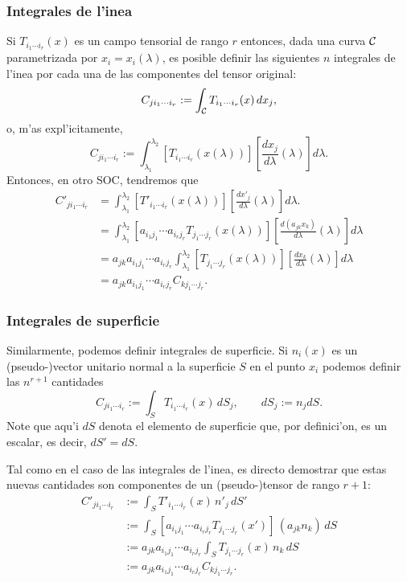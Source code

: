 \subsubsection{Integrales de l'inea}
Si $T_{i_1\cdots i_r}(x)$ es un campo tensorial de rango $r$ entonces, dada una curva $\cal C$ parametrizada por $x_i=x_i(\lambda)$, es posible definir las siguientes $n$ integrales de l'inea por cada una de las componentes del tensor original:
\begin{equation}
C_{ji_1\cdots i_r}:=\int_{\cal C}T_{i_1\cdots i_r}(x)\,dx_j,
\end{equation}
o, m'as expl'icitamente,
\begin{equation}
C_{ji_1\cdots i_r}:=\int_{\lambda_1}^{\lambda_2}\left[T_{i_1\cdots i_r}(x(\lambda))\right]\left[\frac{dx_j}{d\lambda}(\lambda)\right]d\lambda.
\end{equation}
Entonces, en otro SOC, tendremos que
\begin{align}
C'_{ji_1\cdots i_r} &=\int_{\lambda_1}^{\lambda_2}\left[T'_{i_1\cdots i_r}(x(\lambda))\right]\left[\frac{dx'_j}{d\lambda}(\lambda)\right]d\lambda.\\
&=\int_{\lambda_1}^{\lambda_2}\left[a_{i_1j_1}\cdots a_{i_rj_r}T_{j_1\cdots j_r}(x(\lambda))\right]\left[\frac{d(a_{jk}x_k)}{d\lambda}(\lambda)\right]d\lambda \\
&=a_{jk}a_{i_1j_1}\cdots a_{i_rj_r} \int_{\lambda_1}^{\lambda_2}\left[T_{j_1\cdots j_r}(x(\lambda))\right]\left[\frac{dx_k}{d\lambda}(\lambda)\right]d\lambda \\
&=a_{jk}a_{i_1j_1}\cdots a_{i_rj_r} C_{kj_1\cdots j_r}.
\end{align}

\subsubsection{Integrales de superficie}
Similarmente, podemos definir integrales de superficie. Si $n_i(x)$ es un (pseudo-)vector unitario normal a la superficie $S$ en el punto $x_i$ podemos definir las $n^{r+1}$ cantidades
\begin{equation}
C_{ji_1\cdots i_r}:=\int_S T_{i_1\cdots i_r}(x)\,dS_j, \qquad dS_j:=n_j dS.
\end{equation}
Note que aqu'i $dS$ denota el elemento de superficie que, por definici'on, es un escalar, es decir, $dS'=dS$. 

Tal como en el caso de las integrales de l'inea, es directo demostrar que estas nuevas cantidades son componentes de un (pseudo-)tensor de rango $r+1$:
\begin{align}
C'_{ji_1\cdots i_r} &:= \int_S T'_{i_1\cdots i_r}(x)\,n'_j\,dS' \\
&:= \int_S \left[a_{i_1j_1}\cdots a_{i_rj_r}T_{j_1\cdots j_r}(x')\right]\,(a_{jk}n_k)\, dS \\
&:= a_{jk}a_{i_1j_1}\cdots a_{i_rj_r}\int_S T_{j_1\cdots j_r}(x)\,n_k\, dS \\
&:= a_{jk}a_{i_1j_1}\cdots a_{i_rj_r}C_{kj_1\cdots j_r}  .
\end{align}


